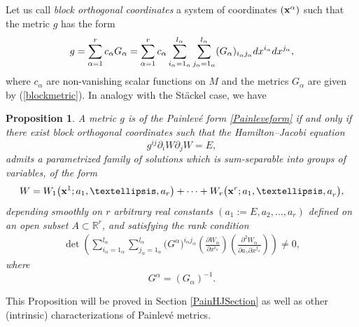 \documentclass[11pt]{article}
\numberwithin{equation}{section}
\newtheorem{Proposition}[Theorem]{Proposition}
 { \theoremstyle{definition}
\newtheorem{Definition}[Theorem]{Definition}
\newtheorem{Example}[Theorem]{Example}
\newtheorem{Remark}[Theorem]{Remark} }
\newcommand{\ialpha}{i_{\alpha}}
\newcommand{\jalpha}{j_{\alpha}}
\newcommand{\lalpha}{l_{\alpha}}
\begin{document}
Let us call \emph{block orthogonal coordinates} a system of coordinates $({\bf x}^{\alpha})$ such that the metric $g$ has the form
\begin{gather*} %
 g=\sum_{\alpha =1}^{r} c_\alpha G_\alpha = \sum_{\alpha =1}^{r} c_\alpha \sum_{\ialpha = 1_{\alpha}}^{\lalpha}\sum_{\jalpha = 1_{\alpha}}^{\lalpha}(G_{\alpha})_{i_{\alpha}j_{\alpha}}{\rm d}x^{i_{\alpha}}{\rm d}x^{j_{\alpha}},
\end{gather*}
where $c_\alpha$ are non-vanishing scalar functions on $M$ and the metrics $G_\alpha$ are given by (\ref{blockmetric}).
In analogy with the St\"ackel case, we have

\begin{Proposition} \label{HJSeparability-Painleve}A metric $g$ is of the Painlev\'e form \eqref{Painleveform} if and only if there exist block orthogonal coordinates such that the Hamilton--Jacobi equation
\[
g^{ij}\partial_{i}W\partial_{j}W=E,
\]
admits a parametrized family of solutions which is sum-separable into groups of variables, of the form
\begin{gather}\label{Painsepform}
W=W_{1}\big({\bf {x}}^{1};{{a}}_{1},\dots ,{{a}}_{r}\big)+\cdots+W_{r}\big({\bf {x}}^{r};{{{a}}_{1},\dots, {a}}_{r}\big),
\end{gather}
depending smoothly on $r$ arbitrary real constants $({{a}}_{1}:=E,a_{2},\dots ,{{a}}_{r})$ defined on an open subset $A\subset \mathbb{R}^{r}$, and satisfying the rank condition
\begin{gather}\label{rankPainHJ}
\det \left(\sum_{\ialpha =1_{\alpha}}^{\lalpha}\sum_{\jalpha =1_{\alpha}}^{\lalpha}\big(G^{\alpha}\big)^{\ialpha \jalpha}\left(\frac{\partial W_{\alpha}}{\partial x^{\ialpha}}\right)\left( \frac{\partial^{2}W_{\alpha}}{\partial a_{\gamma}\partial x^{\jalpha}}\right)\right)\neq 0,
\end{gather}
where
\[
G^{\alpha} = (G_{\alpha})^{-1 }.
\]
\end{Proposition}
This Proposition will be proved in Section \ref{PainHJSection} as well as other (intrinsic) characterizations of Painlev\'e metrics.
\end{document}
